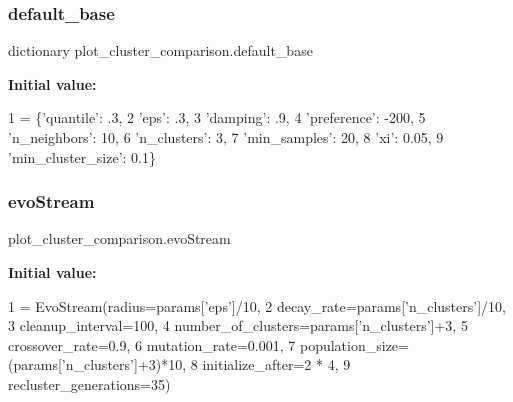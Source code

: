 \subsubsection{\texorpdfstring{default\+\_\+base}{default\_base}}
{\footnotesize\ttfamily dictionary plot\+\_\+cluster\+\_\+comparison.\+default\+\_\+base}

{\bfseries Initial value\+:}
\begin{DoxyCode}
1 =  \{\textcolor{stringliteral}{'quantile'}: .3,
2                 \textcolor{stringliteral}{'eps'}: .3,
3                 \textcolor{stringliteral}{'damping'}: .9,
4                 \textcolor{stringliteral}{'preference'}: -200,
5                 \textcolor{stringliteral}{'n\_neighbors'}: 10,
6                 \textcolor{stringliteral}{'n\_clusters'}: 3,
7                 \textcolor{stringliteral}{'min\_samples'}: 20,
8                 \textcolor{stringliteral}{'xi'}: 0.05,
9                 \textcolor{stringliteral}{'min\_cluster\_size'}: 0.1\}
\end{DoxyCode}
\mbox{\label{namespaceplot__cluster__comparison_a491827f5dfe21e52aecea99d044bf46d}} 
\subsubsection{\texorpdfstring{evo\+Stream}{evoStream}}
{\footnotesize\ttfamily plot\+\_\+cluster\+\_\+comparison.\+evo\+Stream}

{\bfseries Initial value\+:}
\begin{DoxyCode}
1 =  EvoStream(radius=params[\textcolor{stringliteral}{'eps'}]/10,
2                              decay\_rate=params[\textcolor{stringliteral}{'n\_clusters'}]/10,
3                              cleanup\_interval=100,
4                              number\_of\_clusters=params[\textcolor{stringliteral}{'n\_clusters'}]+3,
5                              crossover\_rate=0.9,
6                              mutation\_rate=0.001,
7                              population\_size=(params[\textcolor{stringliteral}{'n\_clusters'}]+3)*10,
8                              initialize\_after=2 * 4,
9                              recluster\_generations=35)
\end{DoxyCode}
\mbox{\label{namespaceplot__cluster__comparison_adc55aa0f44e59e0f3471833db6f25b08}} 
